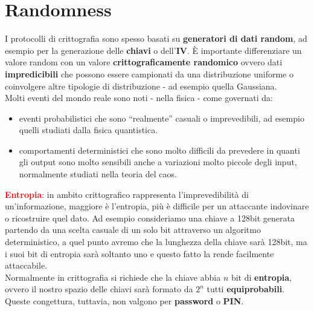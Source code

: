 \chapter{Randomness}
\begin{flushleft}
    I protocolli di crittografia sono spesso basati su \textbf{generatori di dati random}, ad esempio per la generazione delle \textbf{chiavi} o dell'\textbf{IV}. È importante differenziare un valore random con un valore \textbf{crittograficamente randomico} ovvero dati \textbf{impredicibili} che possono essere campionati da una distribuzione uniforme o coinvolgere altre tipologie di distribuzione - ad esempio quella Gaussiana. \\
    Molti eventi del mondo reale sono noti - nella fisica - come governati  da:
    \begin{itemize}[nosep]
        \item eventi probabilistici che sono ``realmente'' casuali o imprevedibili, ad esempio quelli studiati dalla fisica quantistica.
        \item comportamenti deterministici che sono molto difficili da prevedere in quanti gli output sono molto sensibili anche a variazioni molto piccole degli input, normalmente studiati nella teoria del caos.
    \end{itemize}

    \smallskip

    \textcolor{red}{\textbf{Entropia}}: in ambito crittografico rappresenta l'imprevedibilità di un'informazione, maggiore è l'entropia, più è difficile per un attaccante indovinare o ricostruire quel dato. Ad esempio consideriamo una chiave a 128bit generata partendo da una scelta casuale di un solo bit attraverso un algoritmo deterministico, a quel punto avremo che la lunghezza della chiave sarà 128bit, ma i suoi bit di entropia sarà soltanto uno e questo fatto la rende facilmente attaccabile. \\
    Normalmente in crittografia si richiede che la chiave abbia $n$ bit di \textbf{entropia}, ovvero il nostro spazio delle chiavi sarà formato da $2^n$ tutti \textbf{equiprobabili}. Queste congettura, tuttavia, non valgono per \textbf{password} o \textbf{PIN}.

    \smallskip


\end{flushleft}
